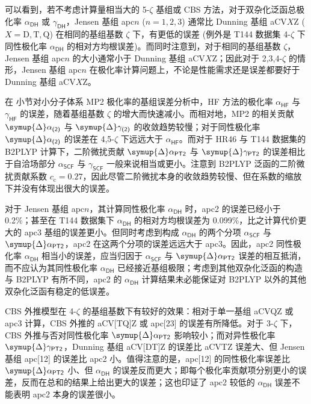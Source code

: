 可以看到，若不考虑计算量相当大的 5-$\zeta$ 基组或 CBS 方法，对于双杂化泛函总极化率 $\alpha_\textsf{DH}$ 或 $\gamma_\textsf{DH}$，Jensen 基组 apc$n$ ($n = 1, 2, 3$) 通常比 Dunning 基组 aCV$X$Z ($X = \mathrm{D, T, Q}$) 在相同的基组基数 $\zeta$ 下，有更低的误差 (例外是 T144 数据集 4-$\zeta$ 下同性极化率 $\alpha_\textsf{DH}$ 的相对方均根误差)。而同时注意到，对于相同的基组基数 $\zeta$，Jensen 基组 apc$n$ 的大小通常小于 Dunning 基组 aCV$X$Z；因此对于 2,3,4-$\zeta$ 的情形，Jensen 基组 apc$n$ 在极化率计算问题上，不论是性能需求还是误差都要好于 Dunning 基组 aCV$X$Z。

在  小节对小分子体系 MP2 极化率的基组误差分析中，HF 方法的极化率 $\alpha_\textsf{HF}$ 与 $\gamma_\textsf{HF}$ 的误差，随着基组基数 $\zeta$ 的增大而快速减小。而相对地，MP2 的相关贡献 $\symup{\Delta} \alpha_\textsf{(2)}$ 与 $\symup{\Delta} \gamma_\textsf{(2)}$ 的收敛趋势较慢；对于同性极化率 $\symup{\Delta} \alpha_\textsf{(2)}$ 的误差在 4,5-$\zeta$ 下远远大于 $\alpha_\textsf{HF}$。而对于 HR46 与 T144 数据集的 B2PLYP 计算下，二阶微扰贡献 $\symup{\Delta} \alpha_\textsf{PT2}$ 与 $\symup{\Delta} \gamma_\textsf{PT2}$ 的误差相比于自洽场部分 $\alpha_\textsf{SCF}$ 与 $\gamma_\textsf{SCF}$ 一般来说相当或更小。注意到 B2PLYP 泛函的二阶微扰贡献系数 $c_\mathrm{c} = 0.27$，因此尽管二阶微扰本身的收敛趋势较慢、但在系数的缩放下并没有体现出很大的误差。

对于 Jensen 基组 apc$n$，其计算同性极化率 $\alpha_\textsf{DH}$ 时，apc2 的误差已经小于 0.2\%；甚至在 T144 数据集下 $\alpha_\textsf{DH}$ 的相对方均根误差为 0.099\%，比之计算代价更大的 apc3 基组的误差更小。但同时考虑到构成 $\alpha_\textsf{DH}$ 的两个分项 $\alpha_\textsf{SCF}$ 与 $\symup{\Delta} \alpha_\textsf{PT2}$，apc2 在这两个分项的误差远远大于 apc3。因此，apc2 同性极化率 $\alpha_\textsf{DH}$ 相当小的误差，应当归因于 $\alpha_\textsf{SCF}$ 与 $\symup{\Delta} \alpha_\textsf{PT2}$ 误差的相互抵消，而不应认为其同性极化率 $\alpha_\textsf{DH}$ 已经接近基组极限；考虑到其他双杂化泛函的构造与 B2PLYP 有所不同，apc2 的 $\alpha_\textsf{DH}$ 计算结果未必能保证对 B2PLYP 以外的其他双杂化泛函有稳定的低误差。

CBS 外推模型在 4-$\zeta$ 的基组基数下有较好的效果：相对于单一基组 aCVQZ 或 apc3 计算，CBS 外推的 aCV[TQ]Z 或 apc[23] 的误差有所降低。对于 3-$\zeta$ 下，CBS 外推与否对同性极化率 $\symup{\Delta} \alpha_\textsf{PT2}$ 影响较小；而对异性极化率 $\symup{\Delta} \gamma_\textsf{PT2}$，Dunning 基组 aCV[DT]Z 的误差比 aCVTZ 误差大、但 Jensen 基组 apc[12] 的误差比 apc2 小。值得注意的是，apc[12] 的同性极化率误差比 $\symup{\Delta} \alpha_\textsf{PT2}$ 小、但 $\alpha_\textsf{DH}$ 的误差反而更大；即每个极化率贡献项分别更小的误差，反而在总和的结果上给出更大的误差；这也印证了 apc2 较低的 $\alpha_\textsf{DH}$ 误差不能表明 apc2 本身的误差很小。

